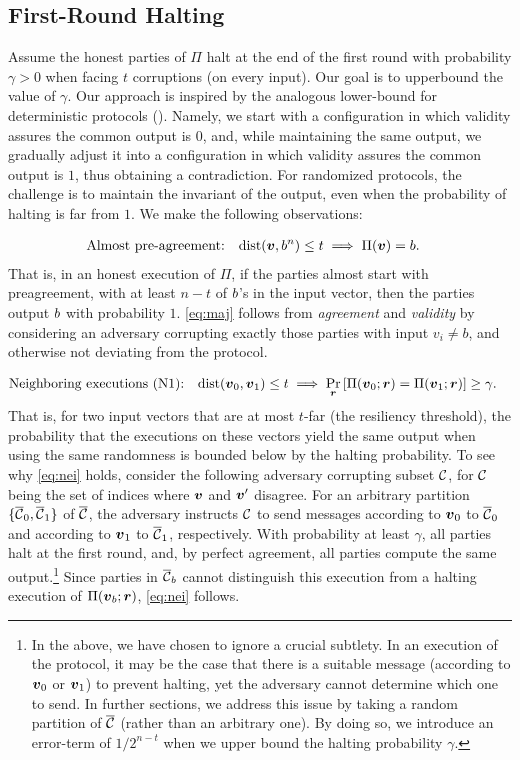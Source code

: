 \subsection{First-Round Halting}\label{sec:technique:1}
Assume the honest parties of $\Pi$ halt at the end of the first round with probability $\gamma>0$ when facing $t$ corruptions (on every input).
Our goal is to upperbound the value of $\gamma$. Our approach is inspired by the analogous lower-bound for deterministic protocols (\cf \cite{FL82,DS83}). Namely, we start with a configuration in which validity assures the common output is $0$, and, while maintaining the same output, we gradually adjust it into a configuration in which validity assures the common output is $1$, thus obtaining a contradiction. For randomized protocols, the challenge is to maintain the invariant of the output, even when the probability of halting is far from $1$. We make the following observations:

\begin{align} \label{eq:maj}
&\text{Almost pre-agreement:} \quad \mathrm{dist}({ \boldsymbol{v}},b^n) \le t \implies \Pi({ \boldsymbol{v}})=b.
\end{align}
That is, in an honest execution of $\Pi$, if the parties almost start with preagreement, \ie with at least $n-t$ of $b$'s in the input vector, then the parties output $b$ with probability $1$. \cref{eq:maj} follows from \emph{agreement} and \emph{validity} by considering an adversary corrupting exactly those parties with input $v_i\neq b$, and otherwise not deviating from the protocol.


\begin{align}\label{eq:nei}
&\text{Neighboring executions (N1):} \quad \mathrm{dist}({ \boldsymbol{v}}_0,{ \boldsymbol{v}}_1)\le t \implies \Pr_{{ \boldsymbol{r}}}\left[\Pi({ \boldsymbol{v}}_0;{ \boldsymbol{r}})=\Pi({ \boldsymbol{v}}_1;{ \boldsymbol{r}})\right]\ge \gamma.
\end{align}
That is, for two input vectors that are at most $t$-far (\ie the resiliency threshold), the probability that the executions on these vectors yield the same output when using the same randomness is bounded below by the halting probability. To see why \cref{eq:nei} holds, consider the following adversary corrupting subset $\mathcal{C}$, for $\mathcal{C}$ being the set of indices where ${ \boldsymbol{v}}$ and ${ \boldsymbol{v}}'$ disagree. For an arbitrary partition $\{\overline{\mathcal{C}}_0,\overline{\mathcal{C}}_1\}$ of $\overline{\mathcal{C}}$, the adversary instructs $\mathcal{C}$ to send messages according to ${ \boldsymbol{v}}_0$ to $\overline{\mathcal{C}}_0$ and according to ${ \boldsymbol{v}}_1$ to $\overline{\mathcal{C}}_1$, respectively. With probability at least $\gamma$, all parties halt at the first round, and, by perfect agreement, all parties compute the same output.\footnote{In the above, we have chosen to ignore a crucial subtlety. In an execution of the protocol, it may be the case that there is a suitable message (according to ${ \boldsymbol{v}}_0$ or ${ \boldsymbol{v}}_1$) to prevent halting, yet the adversary cannot determine which one to send. In further sections, we address this issue by taking a random partition of $\overline{\mathcal{C}}$ (rather than an arbitrary one). By doing so, we introduce an error-term of $1/2^{n-t}$ when we upper bound the halting probability $\gamma$.} Since parties in $\overline{\mathcal{C}}_b$ cannot distinguish this execution from a halting execution of $\Pi({ \boldsymbol{v}}_b;{ \boldsymbol{r}})$, \cref{eq:nei} follows.


